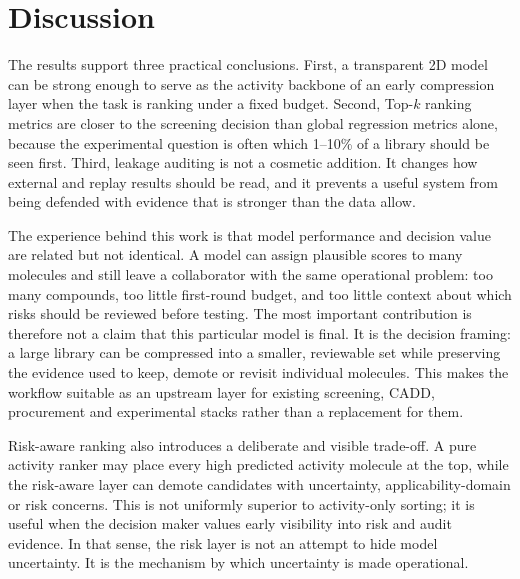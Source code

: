 \documentclass[manuscript=article]{achemso}
\begin{document}
\BootstrapTable
\ConformalTable
\clearpage

\section{Discussion}
The results support three practical conclusions. First, a transparent 2D model
can be strong enough to serve as the activity backbone of an early compression
layer when the task is ranking under a fixed budget. Second, Top-$k$ ranking
metrics are closer to the screening decision than global regression metrics
alone, because the experimental question is often which 1--10\% of a library
should be seen first. Third, leakage auditing is not a cosmetic addition. It
changes how external and replay results should be read, and it prevents a
useful system from being defended with evidence that is stronger than the data
allow.

The experience behind this work is that model performance and decision value
are related but not identical. A model can assign plausible scores to many
molecules and still leave a collaborator with the same operational problem:
too many compounds, too little first-round budget, and too little context about
which risks should be reviewed before testing. The most important contribution
is therefore not a claim that this particular model is final. It is the
decision framing: a large library can be compressed into a smaller, reviewable
set while preserving the evidence used to keep, demote or revisit individual
molecules. This makes the workflow suitable as an upstream layer for existing
screening, CADD, procurement and experimental stacks rather than a replacement
for them.

Risk-aware ranking also introduces a deliberate and visible trade-off. A pure
activity ranker may place every high predicted activity molecule at the top,
while the risk-aware layer can demote candidates with uncertainty,
applicability-domain or risk concerns. This is not uniformly superior to
activity-only sorting; it is useful when the decision maker values early
visibility into risk and audit evidence. In that sense, the risk layer is not
an attempt to hide model uncertainty. It is the mechanism by which uncertainty
is made operational.
\end{document}
